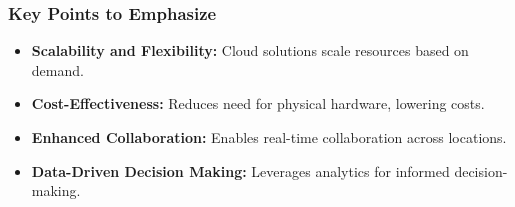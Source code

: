 \documentclass[aspectratio=169]{beamer}
\begin{document}
\begin{frame}[fragile]
    \frametitle{Key Points to Emphasize}
    \begin{itemize}
        \item \textbf{Scalability and Flexibility:} Cloud solutions scale resources based on demand.
        \item \textbf{Cost-Effectiveness:} Reduces need for physical hardware, lowering costs.
        \item \textbf{Enhanced Collaboration:} Enables real-time collaboration across locations.
        \item \textbf{Data-Driven Decision Making:} Leverages analytics for informed decision-making.
    \end{itemize}
\end{frame}
\end{document}

